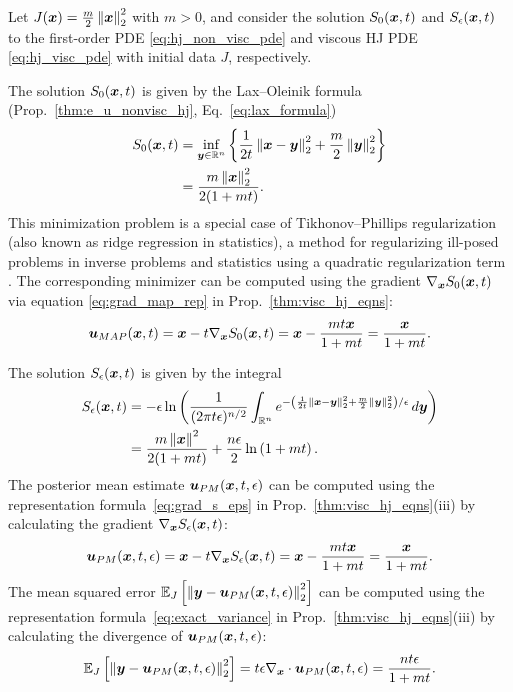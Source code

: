 \begin{example} \label{example:tikhonov}
Let $J(\boldsymbol{x}) = \frac{m}{2}\left \Vert \boldsymbol{x} \right \Vert_{2}^{2}$ with $m>0$, and consider the solution $S_0(\boldsymbol{x},t)$ and $S_{\epsilon}(\boldsymbol{x},t)$ to the first-order PDE \eqref{eq:hj_non_visc_pde} and viscous HJ PDE \eqref{eq:hj_visc_pde} with initial data $J$, respectively. 

The solution $S_0(\boldsymbol{x},t)$ is given by the Lax--Oleinik formula (Prop.~\ref{thm:e_u_nonvisc_hj}, Eq.~\eqref{eq:lax_formula})
\begin{alignat*}{1}
S_0(\boldsymbol{x},t) & =\inf_{\boldsymbol{y}\in\mathbb{R}^n}\left\{ \frac{1}{2t}\left\Vert \boldsymbol{x}-\boldsymbol{y}\right\Vert _{2}^{2}+\frac{m}{2}\left\Vert \boldsymbol{y}\right\Vert _{2}^{2}\right\} \\
& =\frac{m\left\Vert \boldsymbol{x}\right\Vert _{2}^{2}}{2(1+mt)}.
\end{alignat*}
This minimization problem is a special case of Tikhonov--Phillips regularization (also known as ridge regression in statistics), a method for regularizing ill-posed problems in inverse problems and statistics using a quadratic regularization term \cite{phillips1962technique,tikhonov1995numerical}. The corresponding minimizer can be computed using the gradient $\nabla_{\boldsymbol{x}}S_0(\boldsymbol{x},t)$ via equation \eqref{eq:grad_map_rep} in Prop.~\ref{thm:visc_hj_eqns}:
\begin{equation*}
\boldsymbol{u}_{MAP}(\boldsymbol{x},t)  = \boldsymbol{x} - t\nabla_{\boldsymbol{x}}S_0(\boldsymbol{x},t) = \boldsymbol{x} - \frac{mt\boldsymbol{x}}{1+mt} = \frac{\boldsymbol{x}}{1+mt}.
\end{equation*}

The solution $S_\epsilon(\boldsymbol{x},t)$ is given by the integral
\begin{alignat*}{1}
S_{\epsilon}(\boldsymbol{x},t) & =-\epsilon\ln\left(\frac{1}{(2\pi t\epsilon)^{n/2}}\int_{\mathbb{R}^n}e^{-\left(\frac{1}{2t}\left\Vert \boldsymbol{x}-\boldsymbol{y}\right\Vert _{2}^{2}+\frac{m}{2}\left\Vert \boldsymbol{y}\right\Vert _{2}^{2}\right)/\epsilon}\mathop{}\!d\boldsymbol{y}\right)\\
 & =\frac{m\left\Vert \boldsymbol{x}\right\Vert ^{2}}{2(1+mt)}+\frac{n\epsilon}{2}\ln\left(1+mt\right).
\end{alignat*}
The posterior mean estimate $\boldsymbol{u}_{PM}(\boldsymbol{x},t,\epsilon)$ can be computed using the representation formula~\eqref{eq:grad_s_eps} in Prop.~\ref{thm:visc_hj_eqns}(iii) by calculating the gradient $\nabla_{\boldsymbol{x}}S_\epsilon(\boldsymbol{x},t)$:
\begin{equation*}
\boldsymbol{u}_{PM}(\boldsymbol{x},t,\epsilon)  = \boldsymbol{x} - t\nabla_{\boldsymbol{x}}S_\epsilon(\boldsymbol{x},t) = \boldsymbol{x} - \frac{mt\boldsymbol{x}}{1+mt} = \frac{\boldsymbol{x}}{1+mt}.
\end{equation*}
The mean squared error $\mathbb{E}_{J}\left [{\left\Vert{\boldsymbol{y}-\boldsymbol{u}_{PM}(\boldsymbol{x},t,\epsilon)} \right\Vert_{2}^{2}}\right]$ can be computed using the representation formula~\eqref{eq:exact_variance} in Prop.~\ref{thm:visc_hj_eqns}(iii) by calculating the divergence of $\boldsymbol{u}_{PM}(\boldsymbol{x},t,\epsilon)$:
\begin{equation}\label{eq:tikhonov_var}
    \mathbb{E}_{J}\left [{\left \Vert \boldsymbol{y} - \boldsymbol{u}_{PM}(\boldsymbol{x},t,\epsilon)\right \Vert_{2}^{2}}\right] = t\epsilon \nabla_{\boldsymbol{x}} \cdot \boldsymbol{u}_{PM}(\boldsymbol{x},t,\epsilon) = \frac{nt\epsilon}{1+mt}.
\end{equation}


\end{example}
